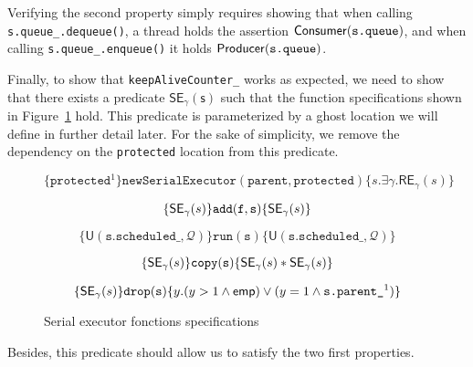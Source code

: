 Verifying the second property simply requires showing that when calling \texttt{s.queue\_.dequeue()}, a thread holds the assertion $\mathsf{Consumer}(\texttt{s.queue})$, and when calling \texttt{s.queue\_.enqueue()} it holds $\mathsf{Producer}(\texttt{s.queue})$.

Finally, to show that \texttt{keepAliveCounter\_} works as expected, we need to show that there exists a predicate $\mathsf{SE_{\gamma}(s)}$ such that the function specifications shown in Figure~\ref{fig:seFctSpec} hold. This predicate is parameterized by a ghost location we will define in further detail later. For the sake of simplicity, we remove the dependency on the \texttt{protected} location from this predicate.

\begin{figure}
\[
		\{\texttt{protected}^1\} \mathtt{newSerialExecutor(parent, protected)} \{s. \exists \gamma. \mathsf{RE}_\gamma (s)\}
\]

\[
		\{\mathsf{SE}_\gamma(s)\} \mathtt{add(f, s)} \{\mathsf{SE}_\gamma(s)\}				
\]

\[
		\{\mathsf{U}(\mathtt{s.scheduled\_}, \mathcal{Q})\} \mathtt{run(s)} \{\mathsf{U}(\mathtt{s.scheduled\_}, \mathcal{Q})\}
\]

\[
	\{\mathsf{SE}_\gamma(s)\} \mathtt{copy(s)} \{\mathsf{SE}_\gamma(s) * \mathsf{SE}_\gamma(s)\}
\]

\[
		\{\mathsf{SE}_\gamma(s)\} \mathtt{drop(s)} \{y. (y > 1 \land \mathsf{emp}) \lor (y = 1 \land \texttt{s.parent\_}^1) \}
\]

		\caption{Serial executor fonctions specifications}
		\label{fig:seFctSpec}
\end{figure}

Besides, this predicate should allow us to satisfy the two first properties.
